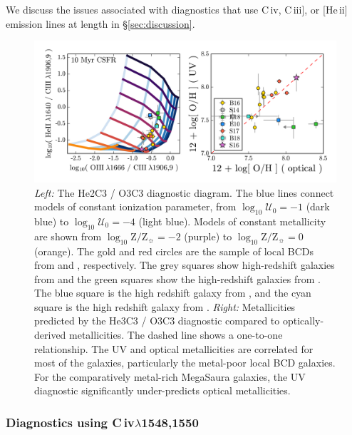 \documentclass[preprint2]{aastex62}
\newcommand{\heii}{[He\,{\sc ii}]\xspace}
\newcommand{\civ}{C\,{\sc iv}\xspace}
\newcommand{\ciii}{C\,{\sc iii}]\xspace}
\newcommand{\logten}{\ensuremath{\log_{10}}}
\newcommand{\logZeq}[1]{\ensuremath{\logten \mathrm{Z}/\mathrm{Z}_{\sun} = #1}}
\newcommand{\logUeq}[1]{\ensuremath{\logten \mathcal{U}_0 = #1}}
\newcommand{\mage}{{\sc Meg}a{\sc S}a{\sc ura}\xspace}
\begin{document}
We discuss the issues associated with diagnostics that use \civ, \ciii, or \heii emission lines at length in \S\ref{sec:discussion}.

\begin{figure}
  \begin{center}
    \includegraphics[width=\linewidth]{figs/f4.png}
    \caption{\emph{Left:} The He2C3 / O3C3 diagnostic diagram.  The blue lines connect models of constant ionization parameter, from \logUeq{-1} (dark blue) to \logUeq{-4} (light blue). Models of constant metallicity are shown from \logZeq{-2} (purple) to \logZeq{0} (orange). The gold and red circles are the sample of local BCDs from \citet{Berg+2016} and \citet{Senchyna+2017}, respectively. The grey squares show high-redshift galaxies from \citet{Stark+2014} and the green squares show the high-redshift galaxies from \citet{Rigby+2018b}. The blue square is the high redshift galaxy from \citet{Erb+2010}, and the cyan square is the high redshift galaxy from \citet{Berg+2018}. \emph{Right:} Metallicities predicted by the He3C3 / O3C3 diagnostic compared to optically-derived metallicities. The dashed line shows a one-to-one relationship. The UV and optical metallicities are correlated for most of the galaxies, particularly the metal-poor local BCD galaxies. For the comparatively metal-rich \mage galaxies, the UV diagnostic significantly under-predicts optical metallicities.}
    \label{fig:UVHe}
  \end{center}
\end{figure}

\subsubsection{Diagnostics using \civ$\lambda$1548,1550}\label{sec:ZZ:UVOpt:CIV}
\end{document}
